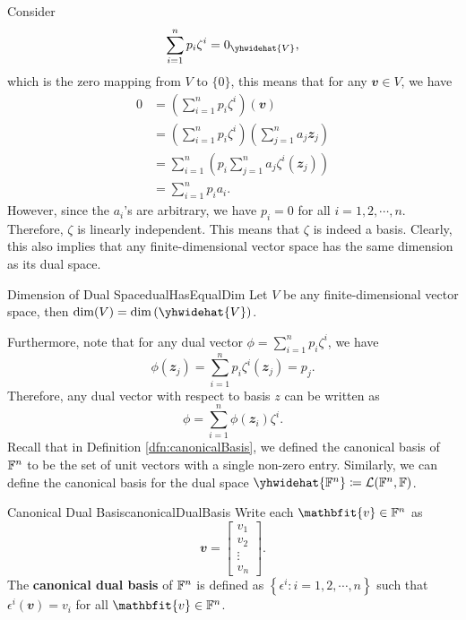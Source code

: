 \documentclass[math, code]{amznotes}
\theoremstyle{remark}
\begin{document}
Consider
\begin{equation*}
    \sum_{i = 1}^{n}p_i\zeta^i = 0_{\yhwidehat{V}},
\end{equation*}
which is the zero mapping from $V$ to $\{0\}$, this means that for any $\mathbfit{v} \in V$, we have
\begin{align*}
    0 & = \left(\sum_{i = 1}^{n}p_i\zeta^i\right)(\mathbfit{v}) \\
    & = \left(\sum_{i = 1}^{n}p_i\zeta^i\right)\left(\sum_{j = 1}^{n}a_j\mathbfit{z}_j\right) \\
    & = \sum_{i = 1}^{n}\left(p_i\sum_{j = 1}^{n}a_j\zeta^i(\mathbfit{z}_j)\right) \\
    & = \sum_{i = 1}^{n}p_ia_i.
\end{align*}
However, since the $a_i$'s are arbitrary, we have $p_i = 0$ for all $i = 1, 2, \cdots, n$. Therefore, $\zeta$ is linearly independent. This means that $\zeta$ is indeed a basis. Clearly, this also implies that any finite-dimensional vector space has the same dimension as its dual space. 
\begin{probox}{Dimension of Dual Space}{dualHasEqualDim}
    Let $V$ be any finite-dimensional vector space, then $\dim(V) = \dim\left(\yhwidehat{V}\right)$.
\end{probox}
Furthermore, note that for any dual vector $\phi = \sum_{i = 1}^{n}p_i\zeta^i$, we have
\begin{equation*}
    \phi(\mathbfit{z}_j) = \sum_{i = 1}^{n}p_i\zeta^i(\mathbfit{z}_j) = p_j.
\end{equation*}
Therefore, any dual vector with respect to basis $z$ can be written as
\begin{equation*}
    \phi = \sum_{i = 1}^{n}\phi(\mathbfit{z}_i)\zeta^i.
\end{equation*}
Recall that in Definition \ref{dfn:canonicalBasis}, we defined the canonical basis of $\mathbb{F}^n$ to be the set of unit vectors with a single non-zero entry. Similarly, we can define the canonical basis for the dual space $\yhwidehat{\F^n} \coloneqq \mathcal{L}(\F^n, \F)$.
\begin{dfnbox}{Canonical Dual Basis}{canonicalDualBasis}
    Write each $\mathbfit{v} \in \F^n$ as
    \begin{equation*}
        \mathbfit{v} = \begin{bmatrix}
            v_1 \\
            v_2 \\
            \vdots \\
            v_n
        \end{bmatrix}.
    \end{equation*}
    The {\color{red} \textbf{canonical dual basis}} of $\mathbb{F}^n$ is defined as $\left\{\epsilon^i \colon i = 1, 2, \cdots, n\right\}$ such that $\epsilon^i(\mathbfit{v}) = v_i$ for all $\mathbfit{v} \in \F^n$.
\end{dfnbox}
\end{document}
